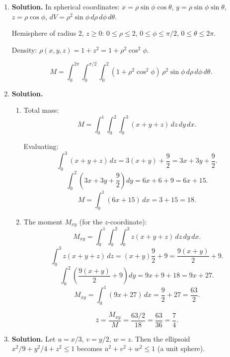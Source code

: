 \begin{enumerate}
Using cylindrical coordinates:
\[
M = \int_0^{2\pi}\int_0^3\int_0^{z/3} kz\cdot r\,dr\,dz\,d\theta.
\]

Inner integral ($r$):
\[
\int_0^{z/3}kz\cdot r\,dr = kz\cdot\frac{r^2}{2}\Big|_0^{z/3} = kz\cdot\frac{z^2}{18} = \frac{kz^3}{18}.
\]

Middle integral ($z$):
\[
\int_0^3\frac{kz^3}{18}\,dz = \frac{k}{18}\cdot\frac{81}{4} = \frac{81k}{72} = \frac{9k}{8}.
\]

Outer integral ($\theta$):
\[
M = 2\pi\cdot\frac{9k}{8} = \boxed{\frac{9\pi k}{4}}.
\]

\item \textbf{Solution.}
In spherical coordinates: $x = \rho\sin\phi\cos\theta$, $y = \rho\sin\phi\sin\theta$, $z = \rho\cos\phi$, $dV = \rho^2\sin\phi\,d\rho\,d\phi\,d\theta$.

Hemisphere of radius 2, $z\ge 0$: $0\le\rho\le 2$, $0\le\phi\le\pi/2$, $0\le\theta\le 2\pi$.

Density: $\rho(x,y,z) = 1+z^2 = 1+\rho^2\cos^2\phi$.

\[
\boxed{M = \int_0^{2\pi}\int_0^{\pi/2}\int_0^2(1+\rho^2\cos^2\phi)\,\rho^2\sin\phi\,d\rho\,d\phi\,d\theta}.
\]

\item \textbf{Solution.}
\begin{enumerate}
\item Total mass:
\[
M = \int_0^1\int_0^2\int_0^3(x+y+z)\,dz\,dy\,dx.
\]

Evaluating:
\[
\int_0^3(x+y+z)\,dz = 3(x+y)+\frac{9}{2} = 3x+3y+\frac{9}{2}.
\]
\[
\int_0^2\left(3x+3y+\frac{9}{2}\right)dy = 6x+6+9 = 6x+15.
\]
\[
M = \int_0^1(6x+15)\,dx = 3+15 = \boxed{18}.
\]

\item The moment $M_{xy}$ (for the $z$-coordinate):
\[
M_{xy} = \int_0^1\int_0^2\int_0^3 z(x+y+z)\,dz\,dy\,dx.
\]
\[
\int_0^3 z(x+y+z)\,dz = (x+y)\frac{9}{2}+9 = \frac{9(x+y)}{2}+9.
\]
\[
\int_0^2\left(\frac{9(x+y)}{2}+9\right)dy = 9x+9+18 = 9x+27.
\]
\[
M_{xy} = \int_0^1(9x+27)\,dx = \frac{9}{2}+27 = \frac{63}{2}.
\]

\[
\bar{z} = \frac{M_{xy}}{M} = \frac{63/2}{18} = \frac{63}{36} = \boxed{\frac{7}{4}}.
\]
\end{enumerate}

\item \textbf{Solution.}
Let $u = x/3$, $v = y/2$, $w = z$. Then the ellipsoid $x^2/9+y^2/4+z^2\le 1$ becomes $u^2+v^2+w^2\le 1$ (a unit sphere).


\end{enumerate}
